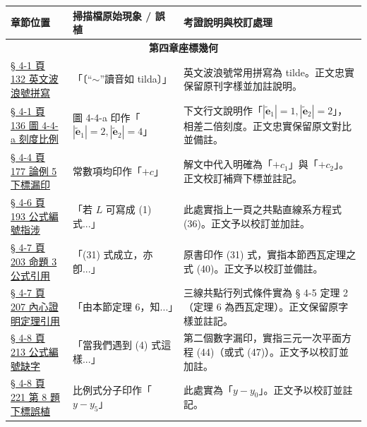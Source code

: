 \documentclass[a4paper,12pt,twoside]{article}
\begin{document}
\begin{table}[H]
\centering
\small
\renewcommand{\arraystretch}{1.35}
\begin{tabularx}{\textwidth}{|p{3.0cm}|p{3.8cm}|X|}
\hline
\textbf{章節位置} & \textbf{掃描檔原始現象 / 誤植} & \textbf{考證說明與校訂處理} \\ \hline

\multicolumn{3}{|c|}{\textbf{第四章\quad 座標幾何}} \\ \hline

\hyperref[note:b3-ch4-p132-tilde-pronounce]{§ 4-1 頁 132 英文波浪號拼寫} & 
「〔“$\sim$”讀音如 tilda〕」 & 
英文波浪號常用拼寫為 tilde。正文忠實保留原刊字樣並加註說明。 \\ \hline

\hyperref[note:b3-ch4-p136-fig4-4-a-scale]{§ 4-1 頁 136 圖 4-4-a 刻度比例} & 
圖 4-4-a 印作「$|\tilde{\mathbf{e}}_1|=2, |\tilde{\mathbf{e}}_2|=4$」 & 
下文行文說明作「$|\tilde{\mathbf{e}}_1|=1, |\tilde{\mathbf{e}}_2|=2$」，相差二倍刻度。正文忠實保留原文對比並備註。 \\ \hline

\hyperref[note:b3-ch4-p177-l1-l2-subscripts]{§ 4-4 頁 177 論例 5 下標漏印} & 
常數項均印作「$+c$」 & 
解文中代入明確為「$+c_1$」與「$+c_2$」。正文校訂補齊下標並註記。 \\ \hline

\hyperref[note:b3-ch4-p193-formula-ref]{§ 4-6 頁 193 公式編號指涉} & 
「若 $L$ 可寫成 (1) 式...」 & 
此處實指上一頁之共點直線系方程式 (36)。正文予以校訂並加註。 \\ \hline

\hyperref[note:b3-ch4-p203-ceva-ref]{§ 4-7 頁 203 命題 3 公式引用} & 
「(31) 式成立，亦卽...」 & 
原書印作 (31) 式，實指本節西瓦定理之式 (40)。正文予以校訂並備註。 \\ \hline

\hyperref[note:b3-ch4-p207-theorem-ref]{§ 4-7 頁 207 內心證明定理引用} & 
「由本節定理 6，知...」 & 
三線共點行列式條件實為 § 4-5 定理 2（定理 6 為西瓦定理）。正文保留原字樣並註記。 \\ \hline

\hyperref[note:b3-ch4-p213-equation-ref]{§ 4-8 頁 213 公式編號缺字} & 
「當我們遇到 (4) 式這樣...」 & 
第二個數字漏印，實指三元一次平面方程 (44)（或式 (47)）。正文予以校訂並加註。 \\ \hline

\hyperref[note:b3-ch4-p221-subscript-typo]{§ 4-8 頁 221 第 8 題下標誤植} & 
比例式分子印作「$y - y_5$」 & 
此處實為「$y - y_0$」。正文予以校訂並註記。 \\ \hline

\end{tabularx}
\end{table}
\end{document}

